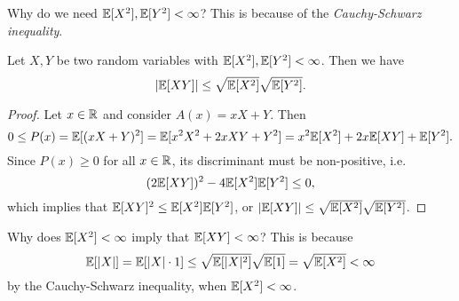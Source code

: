 \begin{remark}
  Why do we need $\mathbb{E}[X^2], \mathbb{E}[Y^2] < \infty$?
  This is because of the \emph{Cauchy-Schwarz inequality}.
\end{remark}

\begin{prop}
  Let $X, Y$ be two random variables with
  $\mathbb{E}[X^2], \mathbb{E}[Y^2] < \infty$. Then we have
  \[
    |\mathbb{E}[XY]| \leq \sqrt{\mathbb{E}[X^2]}\sqrt{\mathbb{E}[Y^2]}.
  \]
\end{prop}

\begin{proof}
  Let $x \in \mathbb{R}$ and consider $A(x) = xX + Y$. Then
  \[
    0 \le P(x) = \mathbb{E}[(xX + Y)^2] = \mathbb{E}[x^2 X^2 + 2x XY + Y^2]
    = x^2 \mathbb{E}[X^2] + 2x \mathbb{E}[XY] + \mathbb{E}[Y^2].
  \]
  Since $P(x) \ge 0$ for all $x \in \mathbb{R}$, its
  discriminant must be non-positive, i.e.
  \[
    (2\mathbb{E}[XY])^2 - 4\mathbb{E}[X^2]\mathbb{E}[Y^2] \le 0,
  \]
  which implies that $\mathbb{E}[XY]^2 \le \mathbb{E}[X^2]\mathbb{E}[Y^2]$,
  or $|\mathbb{E}[XY]| \le \sqrt{\mathbb{E}[X^2]}\sqrt{\mathbb{E}[Y^2]}$.
\end{proof}

\begin{remark}
  Why does $\mathbb{E}[X^2] < \infty$ imply that
  $\mathbb{E}[XY] < \infty$? This is because
  \[
    \mathbb{E}[|X|] = \mathbb{E}[|X| \cdot 1]
    \le \sqrt{\mathbb{E}[|X|^2]}\sqrt{\mathbb{E}[1]}
    = \sqrt{\mathbb{E}[X^2]} < \infty
  \]
  by the Cauchy-Schwarz inequality, when $\mathbb{E}[X^2] < \infty$.
\end{remark}

